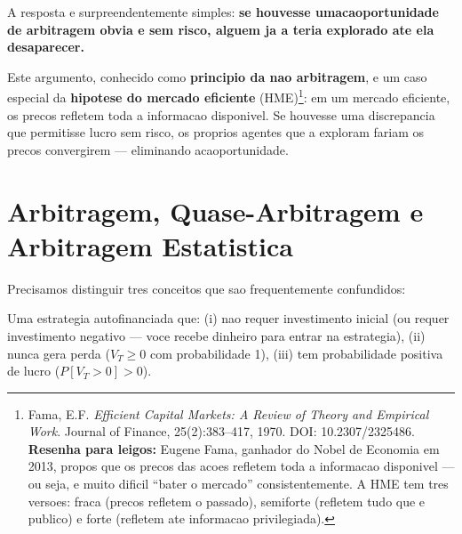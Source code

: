A resposta e surpreendentemente simples: \textbf{se houvesse umacaoportunidade
de arbitragem obvia e sem risco, alguem ja a teria explorado ate ela
desaparecer.}

Este argumento, conhecido como \textbf{principio da nao arbitragem}, e um
caso especial da \textbf{hipotese do mercado eficiente}
(HME)\footnote{Fama, E.F. \textit{Efficient Capital Markets: A Review of
Theory and Empirical Work}. Journal of Finance, 25(2):383--417, 1970. DOI:
10.2307/2325486. \textbf{Resenha para leigos:} Eugene Fama, ganhador do
Nobel de Economia em 2013, propos que os precos das acoes refletem toda a
informacao disponivel --- ou seja, e muito dificil ``bater o mercado''
consistentemente. A HME tem tres versoes: fraca (precos refletem o passado),
semiforte (refletem tudo que e publico) e forte (refletem ate informacao
privilegiada).}: em um mercado eficiente, os precos refletem toda a
informacao disponivel. Se houvesse uma discrepancia que permitisse lucro sem
risco, os proprios agentes que a exploram fariam os precos convergirem ---
eliminando acaoportunidade.

\begin{center}
\end{center}

\section{Arbitragem, Quase-Arbitragem e Arbitragem Estatistica}

Precisamos distinguir tres conceitos que sao frequentemente confundidos:

\begin{defi}
Uma estrategia autofinanciada que: (i) nao requer investimento inicial
(ou requer investimento negativo --- voce recebe dinheiro para entrar na
estrategia), (ii) nunca gera perda ($V_T \geq 0$ com probabilidade 1),
(iii) tem probabilidade positiva de lucro ($P[V_T > 0] > 0$).
\end{defi}

